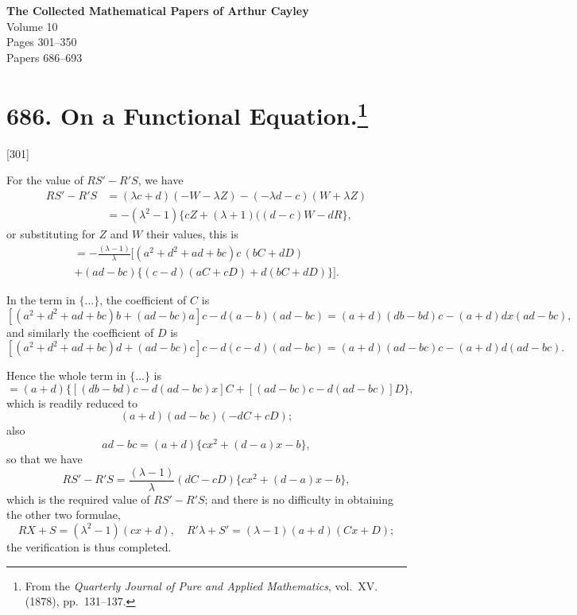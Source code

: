 \documentclass[11pt,a4paper]{book}
\begin{document}
\newpage
\clearpage


\begin{center}
{\Large\bfseries The Collected Mathematical Papers of Arthur Cayley}\\[1em]
{\large Volume 10}\\[2em]
{\large Pages 301--350}\\[2em]
{\normalsize Papers 686--693}
\end{center}

\vspace{2em}


\newpage

\section[On a Functional Equation]{686. On a Functional Equation.\footnote{From the \textit{Quarterly Journal of Pure and Applied Mathematics}, vol.\ XV. (1878), pp.\ 131--137.}}

[301]


For the value of $RS' - R'S$, we have
\begin{align*}
RS' - R'S &= (\lambda c + d)(-W - \lambda Z) - (-\lambda d - c)(W + \lambda Z)\\
&= -(\lambda^2 - 1)\{cZ + (\lambda + 1)((d-c)W - dR\},
\end{align*}
or substituting for $Z$ and $W$ their values, this is
\begin{multline*}
= -\frac{(\lambda - 1)}{\lambda}\bigl[(a^2 + d^2 + ad + bc)c\,(bC + dD)\\
+ (ad - bc)\{(c-d)(aC + cD) + d(bC + dD)\}\bigr].
\end{multline*}

In the term in $\{\dots\}$, the coefficient of $C$ is
\[
[(a^2 + d^2 + ad + bc)b + (ad - bc)a]c - d(a - b)(ad - bc)
= (a + d)(db - bd)c - (a + d)dx(ad - bc),
\]
and similarly the coefficient of $D$ is
\[
[(a^2 + d^2 + ad + bc)d + (ad - bc)c]c - d(c - d)(ad - bc)
= (a + d)(ad - bc)c - (a + d)d(ad - bc).
\]

Hence the whole term in $\{\dots\}$ is
\[
= (a + d)\{[(db - bd)c - d(ad - bc)x]C + [(ad - bc)c - d(ad - bc)]D\},
\]
which is readily reduced to
\[
(a + d)(ad - bc)(-dC + cD);
\]
also
\[
ad - bc = (a + d)\{cx^2 + (d - a)x - b\},
\]
so that we have
\[
RS' - R'S = \frac{(\lambda - 1)}{\lambda}(dC - cD)\{cx^2 + (d - a)x - b\},
\]
which is the required value of $RS' - R'S$; and there is no difficulty in obtaining the other two formulae,
\[
RX + S = (\lambda^2 - 1)(cx + d),\quad R'\lambda + S' = (\lambda - 1)(a + d)(Cx + D);
\]
the verification is thus completed.
\end{document}
